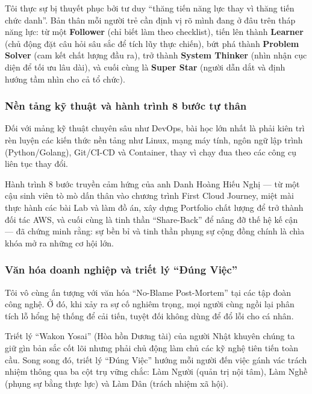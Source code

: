 Tôi thực sự bị thuyết phục bởi tư duy ``thăng tiến năng lực thay vì
thăng tiến chức danh''. Bản thân mỗi người trẻ cần định vị rõ mình đang
ở đâu trên tháp năng lực: từ một \textbf{Follower} (chỉ biết làm theo
checklist), tiến lên thành \textbf{Learner} (chủ động đặt câu hỏi sâu
sắc để tích lũy thực chiến), bứt phá thành \textbf{Problem Solver} (cam
kết chất lượng đầu ra), trở thành \textbf{System Thinker} (nhìn nhận cục
diện để tối ưu lâu dài), và cuối cùng là \textbf{Super Star} (người dẫn
dắt và định hướng tầm nhìn cho cả tổ chức).

\hypertarget{nux1ec1n-tux1ea3ng-kux1ef9-thuux1eadt-vuxe0-huxe0nh-truxecnh-8-bux1b0ux1edbc-tux1ef1-thuxe2n}{%
\subsubsection{Nền tảng kỹ thuật và hành trình 8 bước tự
thân}}

Đối với mảng kỹ thuật chuyên sâu như DevOps, bài học lớn nhất là phải
kiên trì rèn luyện các kiến thức nền tảng như Linux, mạng máy tính, ngôn
ngữ lập trình (Python/Golang), Git/CI-CD và Container, thay vì chạy đua
theo các công cụ liên tục thay đổi.

Hành trình 8 bước truyền cảm hứng của anh Danh Hoàng Hiếu Nghị --- từ
một cậu sinh viên tò mò dấn thân vào chương trình First Cloud Journey,
miệt mài thực hành các bài Lab và làm đồ án, xây dựng Portfolio chất
lượng để trở thành đối tác AWS, và cuối cùng là tinh thần ``Share-Back''
để nâng đỡ thế hệ kế cận --- đã chứng minh rằng: sự bền bỉ và tinh thần
phụng sự cộng đồng chính là chìa khóa mở ra những cơ hội lớn.

\hypertarget{vux103n-huxf3a-doanh-nghiux1ec7p-vuxe0-triux1ebft-luxfd-ux111uxfang-viux1ec7c}{%
\subsubsection{Văn hóa doanh nghiệp và triết lý ``Đúng
Việc''}}

Tôi vô cùng ấn tượng với văn hóa ``No-Blame Post-Mortem'' tại các tập
đoàn công nghệ. Ở đó, khi xảy ra sự cố nghiêm trọng, mọi người cùng ngồi
lại phân tích lỗ hổng hệ thống để cải tiến, tuyệt đối không dùng để đổ
lỗi cho cá nhân.

Triết lý ``Wakon Yosai'' (Hòa hồn Dương tài) của người Nhật khuyên chúng
ta giữ gìn bản sắc cốt lõi nhưng phải chủ động làm chủ các kỹ nghệ tiên
tiến toàn cầu. Song song đó, triết lý ``Đúng Việc'' hướng mỗi người đến
việc gánh vác trách nhiệm thông qua ba cột trụ vững chắc: Làm Người
(quản trị nội tâm), Làm Nghề (phụng sự bằng thực lực) và Làm Dân (trách
nhiệm xã hội).

